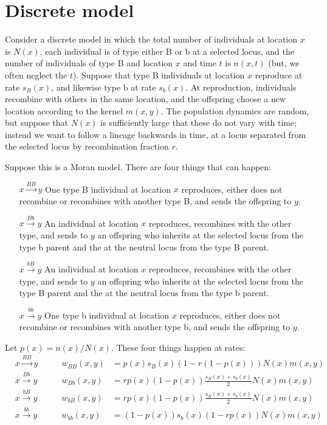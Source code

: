 \documentclass{article}
\begin{document}
\section{Discrete model}

Consider a discrete model in which the total number of individuals at location $x$ is $N(x)$,
each individual is of type either B or b at a selected locus,
and the number of individuals of type B and location $x$ and time $t$ is $n(x,t)$
(but, we often neglect the $t$).
Suppose that type B individuals at location $x$ reproduce at rate $s_B(x)$, 
and likewise type b at rate $s_b(x)$.
At reproduction, individuals recombine with others in the same location,
and the offspring choose a new location according to the kernel $m(x,y)$.
The population dynamics are random, but suppose that $N(x)$ is sufficiently large that these do not vary with time;
instead we want to follow a lineage backwards in time,
at a locus separated from the selected locus by recombination fraction $r$.

Suppose this is a Moran model.
There are four things that can happen:
\begin{enumerate}
    \item[$x\xrightarrow{BB}y$] One type B individual at location $x$ reproduces, 
        either does not recombine or recombines with another type B,
        and sends the offspring to $y$.
    \item[$x\xrightarrow{Bb}y$] An individual at location $x$ reproduces, 
        recombines with the other type,
        and sends to $y$ an offspring
        who inherits at the selected locus from the type b parent 
        and the at the neutral locus from the type B parent.
    \item[$x\xrightarrow{bB}y$] An individual at location $x$ reproduces, 
        recombines with the other type,
        and sends to $y$ an offspring
        who inherits at the selected locus from the type B parent 
        and the at the neutral locus from the type b parent.
    \item[$x\xrightarrow{bb}y$] One type b individual at location $x$ reproduces, 
        either does not recombine or recombines with another type b,
        and sends the offspring to $y$.
\end{enumerate}
Let $p(x) = n(x)/N(x)$.
These four things happen at rates:
\begin{align}
    & x\xrightarrow{BB}y & \qquad w_{BB}(x,y) &= p(x) s_B(x) \left(1 - r (1-p(x)) \right)  N(x) m(x,y) \\
    & x\xrightarrow{Bb}y & \qquad w_{Bb}(x,y) &= r p(x) (1-p(x)) \frac{s_B(x)+s_b(x)}{2} N(x) m(x,y) \\
    & x\xrightarrow{bB}y & \qquad w_{bB}(x,y) &= r p(x) (1-p(x)) \frac{s_B(x)+s_b(x)}{2} N(x) m(x,y) \\
    & x\xrightarrow{bb}y & \qquad w_{bb}(x,y) &= (1-p(x)) s_b(x) \left(1 - r p(x) \right) N(x) m(x,y) 
\end{align}
\end{document}

